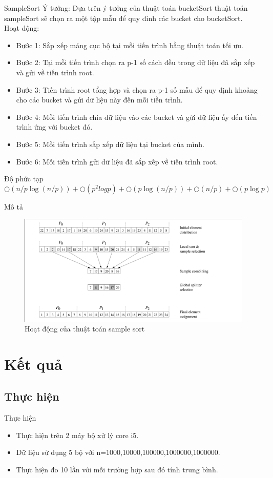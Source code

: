 \documentclass{beamer}
\begin{document}
\begin{frame}{SampleSort}
Ý tưởng: Dựa trên ý tưởng của thuật toán bucketSort thuật toán sampleSort sẽ chọn ra một tập mẫu để quy đinh các bucket cho bucketSort.\\
Hoạt động:
\begin{itemize}
\item Bước 1: Sắp xếp mảng cục bộ tại mỗi tiến trình bằng thuật  toán tối ưu.
\item Bước 2: Tại mỗi tiến trình chọn ra p-1 số cách đều trong dữ liệu đã sắp xếp và gửi về tiến trình root.
\item Bước 3: Tiến trình root tổng hợp và chọn ra p-1 số mẫu để quy định khoảng cho các bucket và gửi dữ liệu này đến mỗi tiền trình.
\item Bước 4: Mỗi tiến trình chia dữ liệu vào các bucket và gửi dữ liệu ấy đến tiến trình ứng với bucket đó. 
\item Bước 5: Mỗi tiến trình sắp xếp dữ liệu tại bucket của mình.
\item Bước 6: Mỗi tiến trình gửi dữ liệu đã sắp xếp về tiến trình root. 
\end{itemize}
{\color{hilight} Độ phức tạp}
 $$\bigcirc(n/p \log(n/p) ) +\bigcirc(p^2 log p) + \bigcirc(p \log (n/p)) + \bigcirc(n/p)+ \bigcirc(p \log p)  $$
\end{frame}
\begin{frame}{Mô tả}
\begin{figure}[H]
\includegraphics[scale=0.4]{SS.png}
\caption{Hoạt động của thuật toán sample sort}
\end{figure}
\end{frame}
\section{Kết quả}
\subsection{Thực hiện}
\begin{frame}{Thực hiện}
\begin{itemize}
\item Thực hiện trên 2 máy bộ xử lý core i5.
\item Dữ liệu sử dụng 5 bộ với n=1000,10000,100000,1000000,1000000.
\item Thực hiện đo 10 lần với mỗi trường hợp sau đó tính trung bình.
\end{itemize}

\end{frame}
\end{document}
